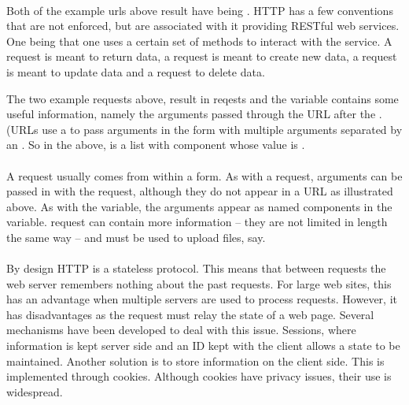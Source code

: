 \paragraph{}
Both of the example urls above result have  being
. HTTP has a few conventions that are not enforced, but
are associated with it providing RESTful web services. One being that
one uses a certain set of methods to interact with the service. A
 request is meant to return data, a  request is
meant to create new data, a  request is meant to update data
and a  request to delete data.

The two example requests above, result in  reqests and the
 variable contains some useful information, namely the
arguments passed through the URL after the . (URLs use a
 to pass arguments in the form  with multiple
arguments separated by an \code{\&}. So in the above,  is a
list with component  whose value is .



\paragraph{}
A  request usually comes from within a form. As with a
 request, arguments can be passed in with the request,
although they do not appear in a URL as illustrated above. As with the
 variable, the arguments appear as named components in the
 variable.  request can contain more information
-- they are not limited in length the same way --
and must be used to upload files, say.



\paragraph{}

By design HTTP is a stateless protocol. This means that between
requests the web server remembers nothing about the past
requests. For large web sites, this has an advantage when multiple
servers are used to process requests. However, it has disadvantages as
the request must relay the state of a web page. Several mechanisms have
been developed to deal with this issue. Sessions, where information is
kept server side and an ID kept with the client allows a state to be
maintained. Another solution is to store information on the client
side. This is implemented through cookies. Although cookies have
privacy issues, their use is widespread. 

